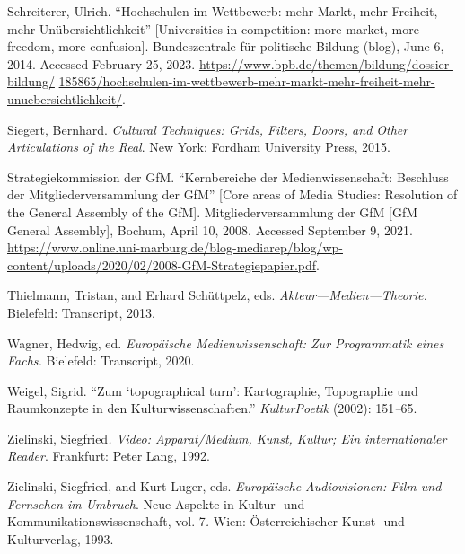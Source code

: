 \documentclass{tufte-handout}
\begin{document}
\begin{hangparas}{.25in}{1}
Schreiterer, Ulrich. ``Hochschulen im Wettbewerb: mehr Markt, mehr
Freiheit, mehr Unübersichtlichkeit'' {[}Universities in competition:
more market, more freedom, more confusion{]}. Bundeszentrale für
politische Bildung (blog), June 6, 2014. Accessed February 25, 2023.
\href{https://www.bpb.de/themen/bildung/dossier-bildung/185865/hochschulen-im-wettbewerb-mehr-markt-mehr-freiheit-mehr-unuebersichtlichkeit/}{https://www.bpb.de/themen/bildung/dossier-bildung/} \href{https://www.bpb.de/themen/bildung/dossier-bildung/185865/hochschulen-im-wettbewerb-mehr-markt-mehr-freiheit-mehr-unuebersichtlichkeit/}{185865/hochschulen-im-wettbewerb-mehr-markt-mehr-freiheit-mehr-unuebersichtlichkeit/}.

Siegert, Bernhard. \emph{Cultural Techniques: Grids, Filters, Doors, and
Other Articulations of the Real}. New York: Fordham University Press,
2015.

Strategiekommission der GfM. ``Kernbereiche der Medienwissenschaft:
Beschluss der Mitgliederversammlung der GfM'' {[}Core areas of Media
Studies: Resolution of the General Assembly of the GfM{]}.
Mitgliederversammlung der GfM {[}GfM General Assembly{]}, Bochum, April
10, 2008. Accessed September 9, 2021.
\url{https://www.online.uni-marburg.de/blog-mediarep/blog/wp-content/uploads/2020/02/2008-GfM-Strategiepapier.pdf}.

Thielmann, Tristan, and Erhard Schüttpelz, eds.
\emph{Akteur---Medien---Theorie.} Bielefeld: Transcript, 2013.

Wagner, Hedwig, ed. \emph{Europäische Medienwissenschaft: Zur
Programmatik eines Fachs.} Bielefeld: Transcript, 2020.

Weigel, Sigrid. ``Zum `topographical turn': Kartographie, Topographie
und Raumkonzepte in den Kulturwissenschaften.'' \emph{KulturPoetik}
(2002): 151\emph{--}65.

Zielinski, Siegfried\emph{. Video: Apparat/Medium, Kunst, Kultur; Ein
internationaler Reader}. Frankfurt: Peter Lang, 1992.

Zielinski, Siegfried, and Kurt Luger, eds. \emph{Europäische
Audiovisionen: Film und Fernsehen im Umbruch}. Neue Aspekte in Kultur-
und Kommunikationswissenschaft, vol. 7\emph{.} Wien: Österreichischer
Kunst- und Kulturverlag, 1993.



\end{hangparas}
\end{document}
